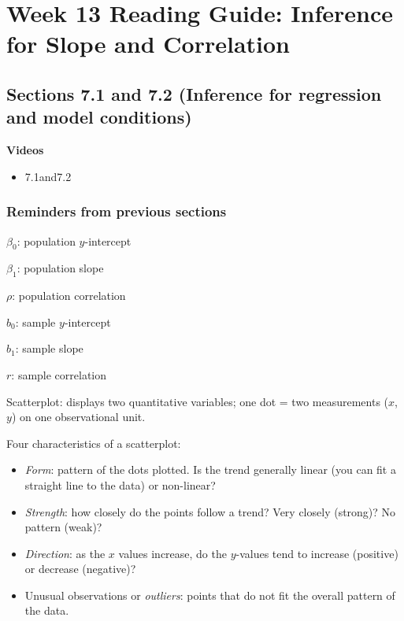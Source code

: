 \documentclass[
]{report}
\providecommand{\tightlist}{%
  \setlength{\itemsep}{0pt}\setlength{\parskip}{0pt}}
\begin{document}
\hypertarget{week-13-reading-guide-inference-for-slope-and-correlation}{%
\section{Week 13 Reading Guide: Inference for Slope and Correlation}\label{week-13-reading-guide-inference-for-slope-and-correlation}}

\hypertarget{sections-7.1-and-7.2-inference-for-regression-and-model-conditions}{%
\subsection*{Sections 7.1 and 7.2 (Inference for regression and model conditions)}\label{sections-7.1-and-7.2-inference-for-regression-and-model-conditions}}

\textbf{Videos}

\begin{itemize}
\tightlist
\item
  7.1and7.2
\end{itemize}


\hypertarget{reminders-from-previous-sections-7}{%
\subsubsection*{Reminders from previous sections}\label{reminders-from-previous-sections-7}}

\(\beta_0\): population \(y\)-intercept

\(\beta_1\): population slope

\(\rho\): population correlation

\(b_0\): sample \(y\)-intercept

\(b_1\): sample slope

\(r\): sample correlation

Scatterplot: displays two quantitative variables; one dot = two measurements (\(x\), \(y\)) on one observational unit.

Four characteristics of a scatterplot:

\begin{itemize}
\tightlist
\item
  \emph{Form}: pattern of the dots plotted. Is the trend generally linear (you can fit a straight line to the data) or non-linear?\\
\item
  \emph{Strength}: how closely do the points follow a trend? Very closely (strong)? No pattern (weak)?\\
\item
  \emph{Direction}: as the \(x\) values increase, do the \(y\)-values tend to increase (positive) or decrease (negative)?\\
\item
  Unusual observations or \emph{outliers}: points that do not fit the overall pattern of the data.
\end{itemize}
\end{document}
